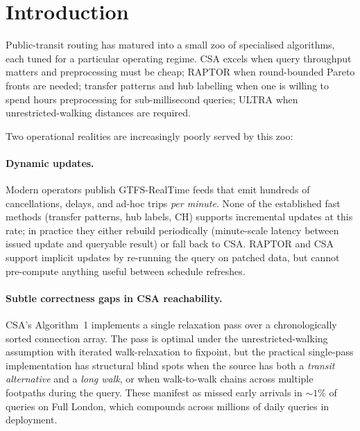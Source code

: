 \documentclass[letterpaper]{article}
\theoremstyle{definition}
\theoremstyle{plain}
\begin{document}
\begin{abstract}
We complement TEEG-INCR with TEEG-ALT, a static EA query engine on
the same substrate. On Berlin and NYC, TEEG-ALT-v2 beats compiled CSA by
$2.3\text{--}5.0\times$ at $\geq\!99.3\%$ EA parity (Table~1
single-run; 3-rep bootstrap with non-overlapping CI95\% in supp
Table~S6), reproducing across two
independent bench machines. All baselines (CSA, RAPTOR, ULTRA, HL,
CH) are compiled with Numba JIT for a like-for-like static
comparison; cross-implementation comparison against the published
C++ KIT-ULTRA reference is reported in §\ref{sec:cross-impl}.

\noindent\emph{Anonymous code release}:
\url{https://anonymous.4open.science/r/teeg-incr-aaai2027-3CD9/}
\end{abstract}

\section{Introduction}

Public-transit routing has matured into a small zoo of specialised algorithms,
each tuned for a particular operating regime. CSA \cite{dibbelt2018csa} excels
when query throughput matters and preprocessing must be cheap; RAPTOR
\cite{delling2015raptor} when round-bounded Pareto fronts are needed; transfer
patterns and hub labelling \cite{bast2010tp,delling2014hublabel} when one is
willing to spend hours preprocessing for sub-millisecond queries; ULTRA
\cite{baum2019ultra} when unrestricted-walking distances are required.

Two operational realities are increasingly poorly served by this zoo:

\paragraph{Dynamic updates.} Modern operators publish GTFS-RealTime feeds
\cite{gtfsrt} that emit hundreds of cancellations, delays, and ad-hoc trips
\emph{per minute}. None of the established fast methods (transfer patterns,
hub labels, CH) supports incremental updates at this rate; in practice they
either rebuild periodically (minute-scale latency between issued update and
queryable result) or fall back to CSA. RAPTOR and CSA support implicit
updates by re-running the query on patched data, but cannot pre-compute
anything useful between schedule refreshes.

\paragraph{Subtle correctness gaps in CSA reachability.} CSA's Algorithm~1
\cite{dibbelt2018csa} implements a single relaxation pass over a
chronologically sorted connection array. The pass is optimal under
the unrestricted-walking assumption with iterated walk-relaxation to
fixpoint, but the practical single-pass implementation has structural
blind spots when the source has both a \emph{transit alternative} and
a \emph{long walk}, or when walk-to-walk chains across multiple
footpaths during the query. These manifest as missed early arrivals
in $\sim 1\%$ of queries on Full London, which compounds across
millions of daily queries in deployment.
\end{document}
